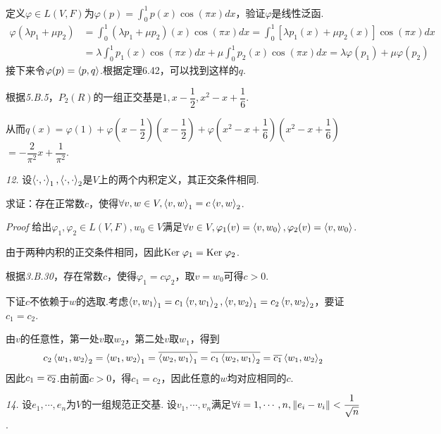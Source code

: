 定义\(\varphi \in L(V,F)\)为\(\varphi(p)=\int_{0}^{1} p(x)\cos(\pi x)dx\)，验证\(\varphi\)是线性泛函.
    \begin{align*}
        \varphi(\lambda p_1+\mu p_2)&=\int_{0}^{1} (\lambda p_1+\mu p_2)(x)\cos(\pi x)dx
        =\int_{0}^{1} [\lambda p_1(x)+\mu p_2(x)]\cos(\pi x)dx \\
        &=\lambda \int_{0}^{1}p_1(x)\cos(\pi x)dx+\mu \int_{0}^{1}p_2(x)\cos(\pi x)dx
        =\lambda \varphi(p_1)+\mu \varphi(p_2)
    \end{align*}
接下来令\(\varphi(p)=\left\langle p,q \right\rangle\).根据定理6.42，可以找到这样的\(q\).

根据\textit{5.B.5}，\(P_2(R)\)的一组正交基是\(1,x-\dfrac{1}{2},x^2-x+\dfrac{1}{6}\).

从而\(q(x)=\varphi(1)+\varphi(x-\dfrac{1}{2})(x-\dfrac{1}{2})+\varphi(x^2-x+\dfrac{1}{6})(x^2-x+\dfrac{1}{6})\)
\(=-\dfrac{2}{\pi^2}x+\dfrac{1}{\pi^2}\).

\hspace*{\fill}

\textit{12.}
设\(\left\langle \cdot,\cdot \right\rangle_1,\left\langle \cdot,\cdot \right\rangle_2\)是\(V\)上的两个内积定义，其正交条件相同.

求证：存在正常数\(c\)，使得\(\forall v,w \in V,\left\langle v,w \right\rangle_1=c\left\langle v,w \right\rangle_2\).

\textit{Proof}
给出\(\varphi_1,\varphi_2 \in L(V,F),w_0 \in V\)满足\(\forall v \in V,\varphi_1(v)=\left\langle v,w_0 \right\rangle,\varphi_2(v)=\left\langle v,w_0 \right\rangle\).

由于两种内积的正交条件相同，因此\(\mathrm{Ker \;} \varphi_1=\mathrm{Ker \;} \varphi_2\).

根据\textit{3.B.30}，存在常数\(c\)，使得\(\varphi_1=c\varphi_2\)，取\(v=w_0\)可得\(c>0\).

下证\(c\)不依赖于\(w\)的选取.考虑\(\left\langle v,w_1 \right\rangle_1=c_1\left\langle v,w_1 \right\rangle_2,\left\langle v,w_2 \right\rangle_1=c_2\left\langle v,w_2 \right\rangle_2\)，要证\(c_1=c_2\).

由\(v\)的任意性，第一处\(v\)取\(w_2\)，第二处\(v\)取\(w_1\)，得到
    \begin{align*}
        c_2\left\langle w_1,w_2 \right\rangle_2=\left\langle w_1,w_2 \right\rangle_1=\overline{\left\langle w_2,w_1 \right\rangle_1}
        =\overline{c_1\left\langle w_2,w_1 \right\rangle_2}=\overline{c_1}\left\langle w_1,w_2 \right\rangle_2
    \end{align*}
因此\(c_1=\overline{c_2}\).由前面\(c>0\)，得\(c_1=c_2\)，因此任意的\(w\)均对应相同的\(c\).

\hspace*{\fill}

\textit{14.}
设\(e_1,\cdots,e_n\)为\(V\)的一组规范正交基.
设\(v_1,\cdots,v_n\)满足\(\forall i=1,\cdots,n,\left\lVert e_i-v_i \right\rVert<\dfrac{1}{\sqrt{n}}\).

